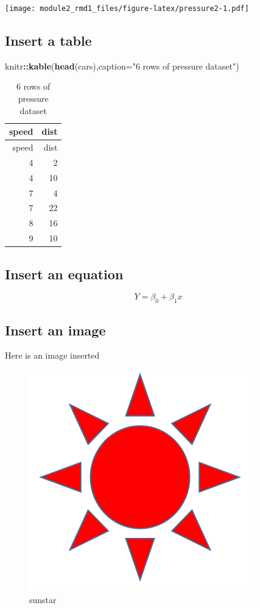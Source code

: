 \documentclass[]{article}
\newenvironment{Shaded}{\begin{snugshade}}{\end{snugshade}}
\newcommand{\KeywordTok}[1]{\textcolor[rgb]{0.13,0.29,0.53}{\textbf{#1}}}
\newcommand{\DataTypeTok}[1]{\textcolor[rgb]{0.13,0.29,0.53}{#1}}
\newcommand{\StringTok}[1]{\textcolor[rgb]{0.31,0.60,0.02}{#1}}
\newcommand{\OperatorTok}[1]{\textcolor[rgb]{0.81,0.36,0.00}{\textbf{#1}}}
\newcommand{\NormalTok}[1]{#1}
\begin{document}
\texttt{[image: module2\_rmd1\_files/figure-latex/pressure2-1.pdf]}

\subsection{Insert a table}\label{insert-a-table}

\begin{Shaded}
\begin{Highlighting}[]
\NormalTok{knitr}\OperatorTok{::}\KeywordTok{kable}\NormalTok{(}\KeywordTok{head}\NormalTok{(cars),}\DataTypeTok{caption=}\StringTok{"6 rows of pressure dataset"}\NormalTok{)}
\end{Highlighting}
\end{Shaded}

\begin{longtable}[]{@{}rr@{}}
\caption{6 rows of pressure dataset}\tabularnewline
\toprule
speed & dist\tabularnewline
\midrule
\endfirsthead
\toprule
speed & dist\tabularnewline
\midrule
\endhead
4 & 2\tabularnewline
4 & 10\tabularnewline
7 & 4\tabularnewline
7 & 22\tabularnewline
8 & 16\tabularnewline
9 & 10\tabularnewline
\bottomrule
\end{longtable}

\subsection{Insert an equation}\label{insert-an-equation}

\[ Y = \beta_0 + \beta_1x\]

\subsection{Insert an image}\label{insert-an-image}

Here is an image inserted

\begin{figure}
\centering
\includegraphics{sunstar.png}
\caption{sunstar}
\end{figure}
\end{document}
